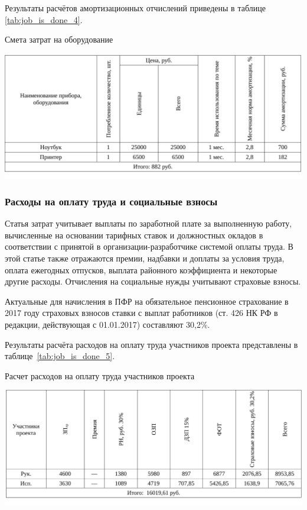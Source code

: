 Результаты расчётов амортизационных отчислений приведены в таблице \ref{tab:job_is_done_4}.

\begin{table}[!ht]
\caption{Смета затрат на оборудование}
\centering
\includegraphics[page=1, width=1\linewidth]{tables/economics/schedule_4.pdf}
\label{tab:job_is_done_4}
\end{table}

\subsubsection{Расходы на оплату труда и социальные взносы}

Статья затрат учитывает выплаты по заработной плате за выполненную работу, 
вычисленные на основании тарифных ставок и должностных окладов в соответствии с принятой в 
организации-разработчике системой оплаты труда. В этой статье также отражаются премии, надбавки и доплаты за 
условия труда, оплата ежегодных отпусков, выплата районного коэффициента и некоторые другие расходы. 
Отчисления на социальные нужды учитывают страховые взносы.

Актуальные для начисления в ПФР на обязательное пенсионное страхование
в 2017 году страховых взносов ставки с выплат работников 
(ст. 426 НК РФ в редакции, действующая с 01.01.2017) составляют 30,2\%.

Результаты расчёта расходов на оплату труда участников проекта представлены в таблице~\ref{tab:job_is_done_5}.

\begin{table}[!ht]
\caption{Расчет расходов на оплату труда участников проекта}
\centering
\includegraphics[page=1, width=1\linewidth]{tables/economics/schedule_5.pdf}
\label{tab:job_is_done_5}
\end{table}


